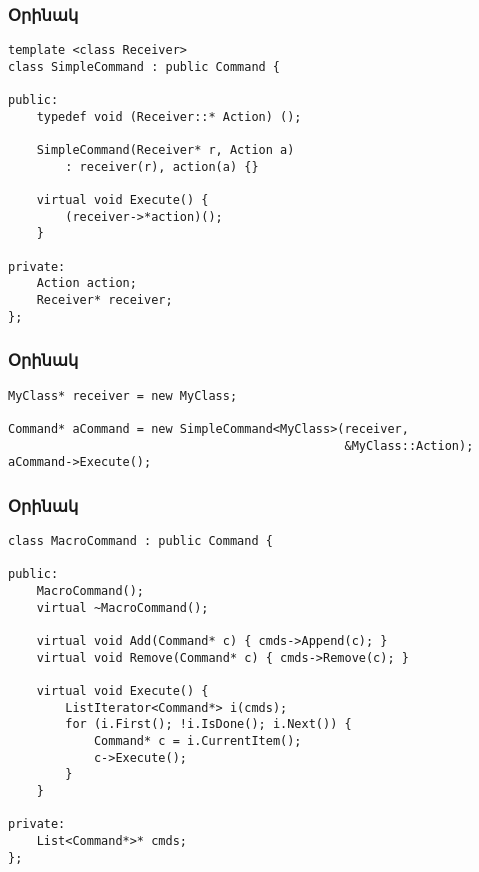 \documentclass{beamer}
\begin{document}
\begin{frame}[fragile]\frametitle{Օրինակ}
\begin{english}
\begin{verbatim}
template <class Receiver>
class SimpleCommand : public Command {

public:
    typedef void (Receiver::* Action) ();

    SimpleCommand(Receiver* r, Action a)
        : receiver(r), action(a) {}

    virtual void Execute() {
        (receiver->*action)();
    }

private:
    Action action;
    Receiver* receiver;
};
\end{verbatim}
\end{english}
\end{frame}

\begin{frame}[fragile]\frametitle{Օրինակ}
\begin{english}
\begin{verbatim}
MyClass* receiver = new MyClass;

Command* aCommand = new SimpleCommand<MyClass>(receiver,
                                               &MyClass::Action);
aCommand->Execute();
\end{verbatim}
\end{english}
\end{frame}

\begin{frame}[fragile]\frametitle{Օրինակ}
\begin{english}
\begin{verbatim}
class MacroCommand : public Command {

public:
    MacroCommand();
    virtual ~MacroCommand();

    virtual void Add(Command* c) { cmds->Append(c); }
    virtual void Remove(Command* c) { cmds->Remove(c); }

    virtual void Execute() {
        ListIterator<Command*> i(cmds);
        for (i.First(); !i.IsDone(); i.Next()) {
            Command* c = i.CurrentItem();
            c->Execute();
        }
    }

private:
    List<Command*>* cmds;
};
\end{verbatim}
\end{english}
\end{frame}
\end{document}
